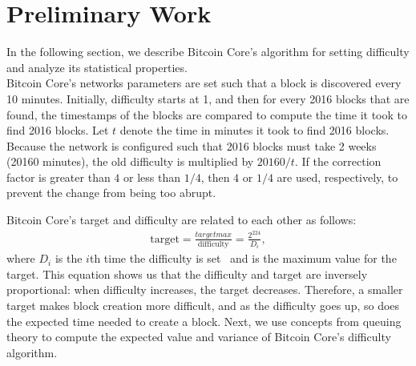 \section{Preliminary Work}\label{sec:prelim}
In the following section, we describe Bitcoin Core's algorithm for setting difficulty and analyze its statistical properties. \\
 Bitcoin Core's networks parameters are set such that a block is discovered every 10 minutes. Initially, difficulty starts at 1, and then for every 2016 blocks that are found, the timestamps of the blocks are compared to compute the time it took to find 2016 blocks. Let $t$ denote the time in minutes it took to find 2016 blocks. Because the network is configured such that 2016 blocks must take 2 weeks (20160 minutes), the old difficulty is multiplied by $20160 / t$. If the correction factor is greater than $4$ or less than $1/4$, then $4$ or $1/4$ are used, respectively, to prevent the change from being too abrupt.
\par \noindent Bitcoin Core's target and difficulty are related to each other as follows:
\begin{align}
\text{target} = \frac{\textit{targetmax}}{\text{difficulty}} = \frac{2^{224}}{{D_i}},
\end{align} 
where $D_i$ is the $i$th time the difficulty is set~\cite{bitcoin:difficulty} and  is the maximum value for the target. This equation shows us that the difficulty and target are inversely proportional: when difficulty increases, the target decreases. Therefore, a smaller target makes block creation more difficult, and as the difficulty goes up, so does the expected time needed to create a block. Next, we use concepts from queuing theory to compute the expected value and variance of Bitcoin Core's difficulty algorithm.

